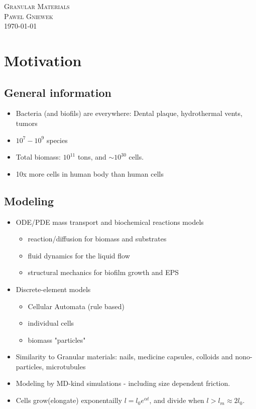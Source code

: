 \documentclass[10pt,a4paper]{article}
\begin{document}
\begin{center}
\textsc{\Large Granular Materials}\\[1.0cm]
\textsc{\LARGE Pawel Gniewek}\\[1.0cm]
\vspace{0.5cm}
\today

\newpage
\tableofcontents
\end{center}

\newpage

\section{Motivation}
\subsection{General information}
\begin{itemize}
 \item Bacteria (and biofils) are everywhere: Dental plaque, hydrothermal vents, tumors
 \item $10^7 - 10^9$ species
 \item Total biomass: $10^{11}$ tons, and $\sim 10^{30}$ cells.
 \item 10x more cells in human body than human cells
\end{itemize}

\subsection{Modeling}
\begin{itemize}
 \item ODE/PDE mass transport and biochemical reactions models
 \begin{itemize}
  \item reaction/diffusion for biomass and substrates
  \item fluid dynamics for the liquid flow
  \item structural mechanics for biofilm growth and EPS
 \end{itemize}
 \item Discrete-element models
  \begin{itemize}
  \item Cellular Automata (rule based)
  \item individual cells
  \item biomass "particles"
 \end{itemize}
 \item Similarity to Granular materials: nails, medicine capsules, colloids and nono-particles, microtubules
 \item Modeling by MD-kind simulations - including size dependent friction.
 \item Cells grow(elongate) exponentailly $ l = l_0 e^{\alpha t}$, and divide when $l > l_m \approx 2l_0$.
\end{itemize}
\end{document}
